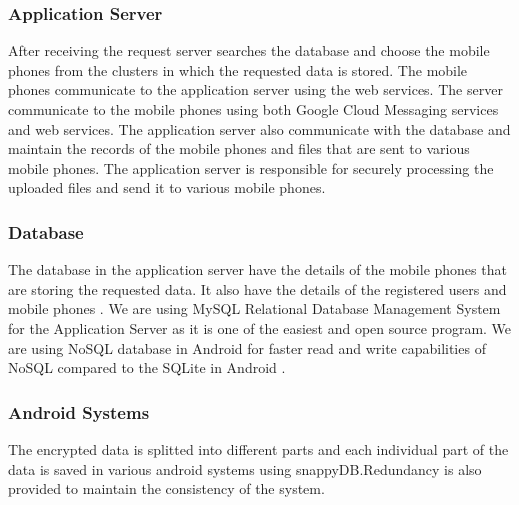 \documentclass[12pt, a4paper]{article}
\begin{document}
\subsubsection{Application Server}
After receiving the request server searches the database and choose the mobile phones from the clusters in which the requested data is stored. The mobile phones communicate to the application server using the web services. The server communicate to the mobile phones using both Google Cloud Messaging services and web services. The application server also communicate with the database and maintain the records of the mobile phones and files that are sent to various mobile phones. The application server is responsible for securely processing the uploaded files and send it to various mobile phones. 
 \subsubsection{Database}
The database in the application server have the details of the mobile phones that are storing the requested data. It also have the details of the registered users and mobile phones . We are using MySQL Relational Database Management System for the Application Server as it is one of the easiest and open source program. We are using NoSQL database in Android for faster read and write capabilities of NoSQL compared to the SQLite in Android .
 \subsubsection{Android Systems}
 The encrypted data is splitted into different parts and each individual part of the data is saved in various android systems using snappyDB.Redundancy is also provided to maintain the consistency of the system.
\newpage
\end{document}
